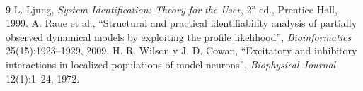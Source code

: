\documentclass[11pt,a4paper]{article}
\begin{document}
\begin{thebibliography}{9}
 L. Ljung, \emph{System Identification: Theory for the User}, 2\textsuperscript{a} ed., Prentice Hall, 1999.
 A. Raue et al., ``Structural and practical identifiability analysis of partially observed dynamical models by exploiting the profile likelihood'', \emph{Bioinformatics} 25(15):1923--1929, 2009.
 H. R. Wilson y J. D. Cowan, ``Excitatory and inhibitory interactions in localized populations of model neurons'', \emph{Biophysical Journal} 12(1):1--24, 1972.
\end{thebibliography}
\end{document}
